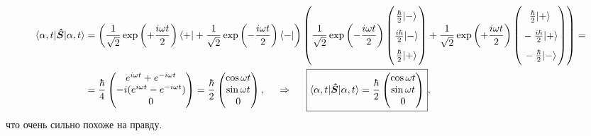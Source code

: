 \begin{align*}
    \langle \alpha, t| \vc{\hat{S}} | \alpha, t\rangle &= 
    \left(
        \frac{1}{\sqrt{2}} \exp\left(+ \frac{i \omega t}{2}\right) \langle +|  + \frac{1}{\sqrt{2}} \exp\left(- \frac{i \omega t}{2}\right) \langle -| 
    \right)\left(
\frac{1}{\sqrt{2}} \exp \left(- \frac{i \omega t}{2}\right) \begin{pmatrix}
            \textstyle \frac{\hbar}{2} | -\rangle   
            \vphantom{\dfrac{1}{2}}\\
            \textstyle \frac{i\hbar}{2} | -\rangle  
            \vphantom{\dfrac{1}{2}}\\
            \textstyle \frac{\hbar}{2} | +\rangle  
            \vphantom{\dfrac{1}{2}}
     \end{pmatrix}
     + \frac{1}{\sqrt{2}} \exp\left(+\frac{i \omega t}{2}\right)
     \begin{pmatrix}
            \vphantom{\dfrac{1}{2}} 
            \textstyle \frac{\hbar}{2} | +\rangle  \\
            \vphantom{\dfrac{1}{2}} 
            \textstyle -\frac{i\hbar}{2} | +\rangle \\
            \vphantom{\dfrac{1}{2}} 
            \textstyle -\frac{\hbar}{2} | -\rangle 
     \end{pmatrix}
     \right) 
     = \\ &=
     \frac{\hbar}{4}
     \begin{pmatrix}
        e^{i \omega t} + e^{- i \omega t}
        \\
        - i(  e^{i\omega t} -  e^{- i \omega t})
        \\
        0
        \\
     \end{pmatrix} = 
     \frac{\hbar}{2}
     \begin{pmatrix}
         \cos \omega t \\
         \sin \omega t \\ 
         0
     \end{pmatrix},
     \hspace{0.5cm} \Rightarrow \hspace{0.5cm}  
\boxed{
    \langle \alpha, t| \vc{\hat{S}} | \alpha, t\rangle =
     \frac{\hbar}{2}
     \begin{pmatrix}
         \cos \omega t \\
         \sin \omega t \\ 
         0
     \end{pmatrix}
},
\end{align*}
что очень сильно похоже на правду.




